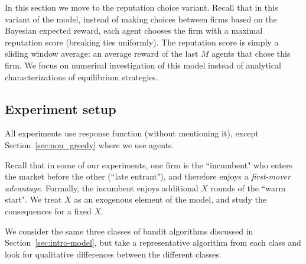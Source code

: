 \documentclass[../competing_bandits.tex]{subfiles}
\begin{document}
In this section we move to the reputation choice variant. Recall that in this variant of the model, instead of making choices between firms based on the Bayesian expected reward, each agent chooses the firm with a maximal reputation score (breaking ties uniformly). The reputation score is simply a sliding window average: an average reward of the last $M$ agents that chose this firm. We focus on numerical investigation of this model instead of analytical characterizations of equilibrium strategies.

\subsection{Experiment setup}
\label{expts-prelims}



 All experiments use \HardMax response function (without mentioning it), except Section~\ref{sec:non_greedy} where we use \HardMaxRandom agents.

Recall that in some of our experiments, one firm is the ``incumbent" who enters the market before the other (``late entrant"), and therefore enjoys a \emph{first-mover advantage}. Formally, the incumbent enjoys additional $X$ rounds of the ``warm start". We treat $X$ as an exogenous element of the model, and study the consequences for a fixed $X$.

 We consider the same three classes of bandit algorithms discussed in Section~\ref{sec:intro-model}, but take a representative algorithm from each class and look for qualitative differences between the different classes. 
\end{document}
